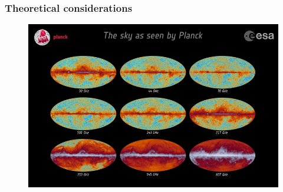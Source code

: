 \begin{frame}
\frametitle{Theoretical considerations}

\begin{figure}
	\includegraphics[width=1.0\textwidth]{images/planck_frequency_channels.jpg}
\end{figure}

\end{frame}